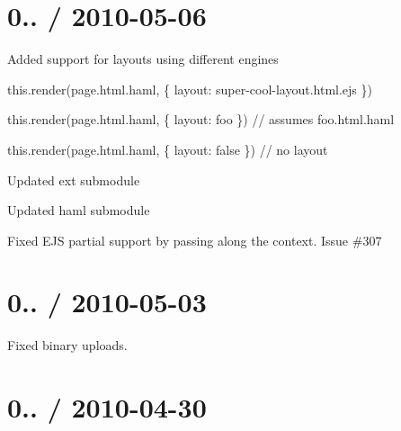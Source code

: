 \section*{0.. / 2010-\/05-\/06 }


\begin{DoxyItemize}
\item Added support for layouts using different engines
\begin{DoxyItemize}
\item this.\+render(\textquotesingle{}page.\+html.\+haml\textquotesingle{}, \{ layout\+: \textquotesingle{}super-\/cool-\/layout.\+html.\+ejs\textquotesingle{} \})
\item this.\+render(\textquotesingle{}page.\+html.\+haml\textquotesingle{}, \{ layout\+: \textquotesingle{}foo\textquotesingle{} \}) // assumes \textquotesingle{}foo.\+html.\+haml\textquotesingle{}
\item this.\+render(\textquotesingle{}page.\+html.\+haml\textquotesingle{}, \{ layout\+: false \}) // no layout
\end{DoxyItemize}
\item Updated ext submodule
\item Updated haml submodule
\item Fixed E\+J\+S partial support by passing along the context. Issue \#307
\end{DoxyItemize}

\section*{0.. / 2010-\/05-\/03 }


\begin{DoxyItemize}
\item Fixed binary uploads.
\end{DoxyItemize}

\section*{0.. / 2010-\/04-\/30 }


